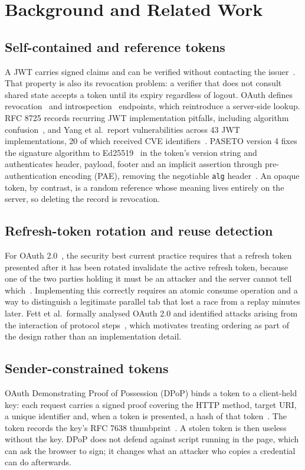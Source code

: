 \documentclass[conference]{IEEEtran}
\begin{document}
\section{Background and Related Work}
\label{sec:related}

\subsection{Self-contained and reference tokens}
A JWT carries signed claims and can be verified without contacting the issuer~\cite{rfc7519}. That property is also its revocation problem: a verifier that does not consult shared state accepts a token until its expiry regardless of logout. OAuth defines revocation~\cite{rfc7009} and introspection~\cite{rfc7662} endpoints, which reintroduce a server-side lookup. RFC 8725 records recurring JWT implementation pitfalls, including algorithm confusion~\cite{rfc8725}, and Yang et al.\ report vulnerabilities across 43 JWT implementations, 20 of which received CVE identifiers~\cite{yang2026jwt}. PASETO version 4 fixes the signature algorithm to Ed25519~\cite{rfc8032} in the token's version string and authenticates header, payload, footer and an implicit assertion through pre-authentication encoding (PAE), removing the negotiable \texttt{alg} header~\cite{pasetov4}. An opaque token, by contrast, is a random reference whose meaning lives entirely on the server, so deleting the record is revocation.

\subsection{Refresh-token rotation and reuse detection}
For OAuth 2.0~\cite{rfc6749}, the security best current practice requires that a refresh token presented after it has been rotated invalidate the active refresh token, because one of the two parties holding it must be an attacker and the server cannot tell which~\cite{rfc9700}. Implementing this correctly requires an atomic consume operation and a way to distinguish a legitimate parallel tab that lost a race from a replay minutes later. Fett et al.\ formally analysed OAuth 2.0 and identified attacks arising from the interaction of protocol steps~\cite{fett2016oauth}, which motivates treating ordering as part of the design rather than an implementation detail.

\subsection{Sender-constrained tokens}
OAuth Demonstrating Proof of Possession (DPoP) binds a token to a client-held key: each request carries a signed proof covering the HTTP method, target URI, a unique identifier and, when a token is presented, a hash of that token~\cite{rfc9449}. The token records the key's RFC 7638 thumbprint~\cite{rfc7638}. A stolen token is then useless without the key. DPoP does not defend against script running in the page, which can ask the browser to sign; it changes what an attacker who copies a credential can do afterwards.
\end{document}

